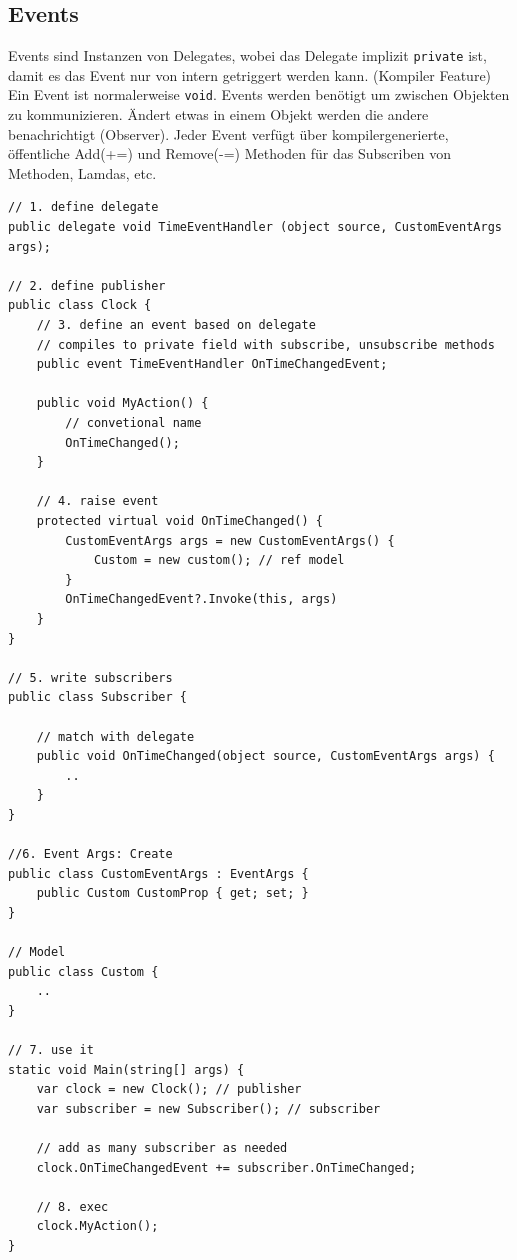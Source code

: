 \documentclass[
a4paper,
oneside,
10pt,
fleqn,
headsepline,
toc=listofnumbered, 
bibliography=totocnumbered]{scrartcl}
\begin{document}
\subsection{Events}
Events sind Instanzen von Delegates, wobei das Delegate  implizit \lstinline|private| ist, damit es das Event nur von intern getriggert werden kann. (Kompiler Feature) Ein Event ist normalerweise \lstinline|void|. Events werden benötigt um zwischen Objekten zu kommunizieren. Ändert etwas in einem Objekt werden die andere benachrichtigt (Observer). Jeder Event verfügt über kompilergenerierte, öffentliche Add(+=) und Remove(-=) Methoden für das Subscriben von Methoden, Lamdas, etc.
\begin{lstlisting}
// 1. define delegate
public delegate void TimeEventHandler (object source, CustomEventArgs args);

// 2. define publisher
public class Clock {
	// 3. define an event based on delegate
	// compiles to private field with subscribe, unsubscribe methods
	public event TimeEventHandler OnTimeChangedEvent;
	
	public void MyAction() {
		// convetional name
		OnTimeChanged();
	}
	
	// 4. raise event
	protected virtual void OnTimeChanged() {
		CustomEventArgs args = new CustomEventArgs() {
			Custom = new custom(); // ref model
		}
		OnTimeChangedEvent?.Invoke(this, args)
	}
}

// 5. write subscribers
public class Subscriber {
	
	// match with delegate
	public void OnTimeChanged(object source, CustomEventArgs args) {
		.. 
	}
}

//6. Event Args: Create 
public class CustomEventArgs : EventArgs {
	public Custom CustomProp { get; set; }
}

// Model
public class Custom {
	..
}

// 7. use it
static void Main(string[] args) {
	var clock = new Clock(); // publisher
	var subscriber = new Subscriber(); // subscriber
	
	// add as many subscriber as needed
	clock.OnTimeChangedEvent += subscriber.OnTimeChanged;
	
	// 8. exec
	clock.MyAction();
}
\end{lstlisting}
\end{document}
